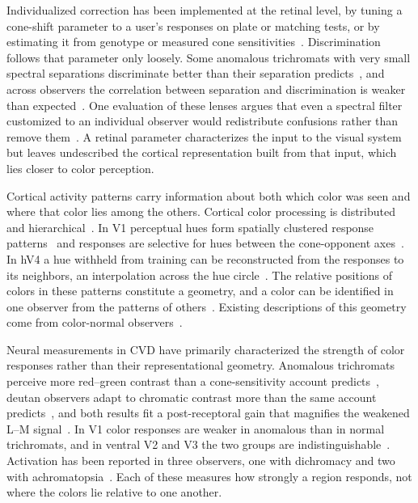 Individualized correction has been implemented at the retinal level, by tuning a cone-shift parameter to a user's responses on plate or matching tests, or by estimating it from genotype or measured cone sensitivities~\citep{deeb2005, stockman2000}. Discrimination follows that parameter only loosely. Some anomalous trichromats with very small spectral separations discriminate better than their separation predicts~\citep{neitz2011}, and across observers the correlation between separation and discrimination is weaker than expected~\citep{bosten2019}. One evaluation of these lenses argues that even a spectral filter customized to an individual observer would redistribute confusions rather than remove them~\citep{gomezrobledo2018}. A retinal parameter characterizes the input to the visual system but leaves undescribed the cortical representation built from that input, which lies closer to color perception.

Cortical activity patterns carry information about both which color was seen and where that color lies among the others. Cortical color processing is distributed and hierarchical~\citep{gegenfurtner2003, shapley2011, conway2018}. In V1 perceptual hues form spatially clustered response patterns~\citep{parkes2009} and responses are selective for hues between the cone-opponent axes~\citep{kuriki2015}. In hV4 a hue withheld from training can be reconstructed from the responses to its neighbors, an interpolation across the hue circle~\citep{brouwer2009}. The relative positions of colors in these patterns constitute a geometry, and a color can be identified in one observer from the patterns of others~\citep{bannert2025}. Existing descriptions of this geometry come from color-normal observers~\citep{brouwer2009, brouwer2013, kuriki2015}.

Neural measurements in CVD have primarily characterized the strength of color responses rather than their representational geometry.  Anomalous trichromats perceive more red--green contrast than a cone-sensitivity account predicts~\citep{boehm2014}, deutan observers adapt to chromatic contrast more than the same account predicts~\citep{basim2025}, and both results fit a post-receptoral gain that magnifies the weakened L--M signal~\citep{webster2015}. In V1 color responses are weaker in anomalous than in normal trichromats, and in ventral V2 and V3 the two groups are indistinguishable~\citep{tregillus2021}. Activation has been reported in three observers, one with dichromacy and two with achromatopsia~\citep{rina2024}. Each of these measures how strongly a region responds, not where the colors lie relative to one another.

